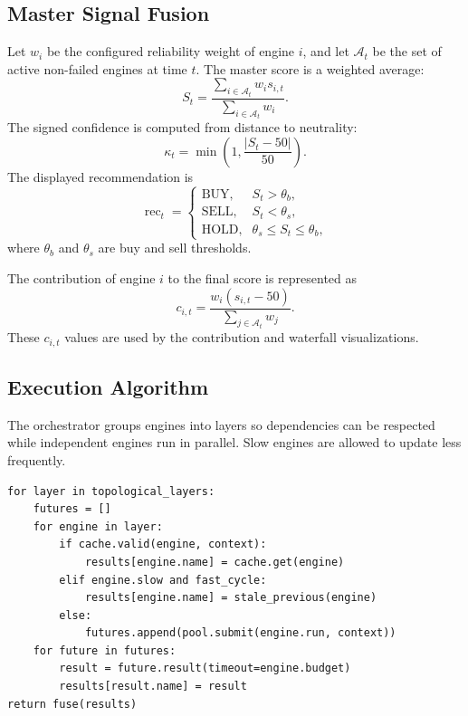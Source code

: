 \documentclass[conference]{IEEEtran}
\begin{document}
\subsection{Master Signal Fusion}

Let $w_i$ be the configured reliability weight of engine $i$, and let
$\mathcal{A}_t$ be the set of active non-failed engines at time $t$. The
master score is a weighted average:
\begin{equation}
S_t = \frac{\sum_{i\in\mathcal{A}_t} w_i s_{i,t}}
{\sum_{i\in\mathcal{A}_t} w_i}.
\end{equation}
The signed confidence is computed from distance to neutrality:
\begin{equation}
\kappa_t = \min\left(1,\frac{|S_t-50|}{50}\right).
\end{equation}
The displayed recommendation is
\begin{equation}
\operatorname{rec}_t =
\begin{cases}
\text{BUY}, & S_t > \theta_b,\\
\text{SELL}, & S_t < \theta_s,\\
\text{HOLD}, & \theta_s \leq S_t \leq \theta_b,
\end{cases}
\end{equation}
where $\theta_b$ and $\theta_s$ are buy and sell thresholds.

The contribution of engine $i$ to the final score is represented as
\begin{equation}
c_{i,t} = \frac{w_i(s_{i,t}-50)}{\sum_{j\in\mathcal{A}_t} w_j}.
\end{equation}
These $c_{i,t}$ values are used by the contribution and waterfall
visualizations.

\subsection{Execution Algorithm}

The orchestrator groups engines into layers so dependencies can be respected
while independent engines run in parallel. Slow engines are allowed to update
less frequently.

\begin{lstlisting}
for layer in topological_layers:
    futures = []
    for engine in layer:
        if cache.valid(engine, context):
            results[engine.name] = cache.get(engine)
        elif engine.slow and fast_cycle:
            results[engine.name] = stale_previous(engine)
        else:
            futures.append(pool.submit(engine.run, context))
    for future in futures:
        result = future.result(timeout=engine.budget)
        results[result.name] = result
return fuse(results)
\end{lstlisting}
\end{document}
